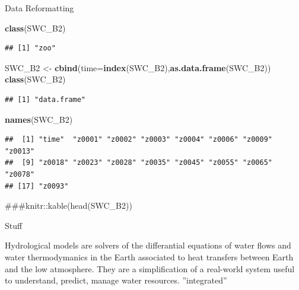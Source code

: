 \documentclass[ignorenonframetext,]{beamer}
\newenvironment{Shaded}{\begin{snugshade}}{\end{snugshade}}
\newcommand{\KeywordTok}[1]{\textcolor[rgb]{0.13,0.29,0.53}{\textbf{#1}}}
\newcommand{\DataTypeTok}[1]{\textcolor[rgb]{0.13,0.29,0.53}{#1}}
\newcommand{\StringTok}[1]{\textcolor[rgb]{0.31,0.60,0.02}{#1}}
\newcommand{\NormalTok}[1]{#1}
\begin{document}
\begin{frame}[fragile]{Data Reformatting}

\begin{Shaded}
\begin{Highlighting}[]
\KeywordTok{class}\NormalTok{(SWC_B2)}
\end{Highlighting}
\end{Shaded}

\begin{verbatim}
## [1] "zoo"
\end{verbatim}

\begin{Shaded}
\begin{Highlighting}[]
\NormalTok{SWC_B2 <-}\StringTok{ }\KeywordTok{cbind}\NormalTok{(}\DataTypeTok{time=}\KeywordTok{index}\NormalTok{(SWC_B2),}\KeywordTok{as.data.frame}\NormalTok{(SWC_B2))}
\KeywordTok{class}\NormalTok{(SWC_B2)}
\end{Highlighting}
\end{Shaded}

\begin{verbatim}
## [1] "data.frame"
\end{verbatim}

\begin{Shaded}
\begin{Highlighting}[]
\KeywordTok{names}\NormalTok{(SWC_B2)}
\end{Highlighting}
\end{Shaded}

\begin{verbatim}
##  [1] "time"  "z0001" "z0002" "z0003" "z0004" "z0006" "z0009" "z0013"
##  [9] "z0018" "z0023" "z0028" "z0035" "z0045" "z0055" "z0065" "z0078"
## [17] "z0093"
\end{verbatim}

\begin{Shaded}
\begin{Highlighting}[]
\NormalTok{###knitr::kable(head(SWC_B2))}
\end{Highlighting}
\end{Shaded}

\end{frame}

\begin{frame}{Stuff}

Hydrological models are solvers of the differantial equations of water
flows and water thermodymanics in the Earth associated to heat transfers
between Earth and the low atmosphere. They are a simplification of a
real-world system useful to understand, predict, manage water resources.
''integrated''

\end{frame}
\end{document}
